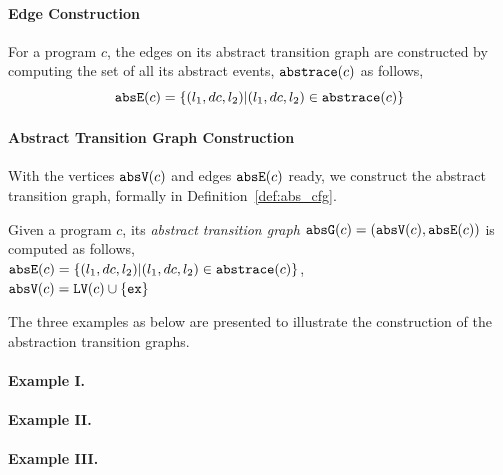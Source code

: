 \paragraph{Edge Construction}
For a program $c$, the edges on its abstract transition graph are constructed by computing the set of all its abstract events, $\mathtt{abs}{\mathtt{trace}}(c)$ as follows,
 \[
 \mathtt{abs}{\mathtt{E}}(c) = \{(l_1, dc, l_2) | (l_1, dc, l_2) \in \mathtt{abs}{\mathtt{trace}}(c)\}
 \]
\paragraph{Abstract Transition Graph Construction} 
With the vertices $\mathtt{abs}{\mathtt{V}}(c)$ and edges $\mathtt{abs}{\mathtt{E}}(c)$ ready, we construct the abstract transition graph, formally in
Definition~\ref{def:abs_cfg}.
%
\begin{defn}
\label{def:abs_cfg}
Given a program $c$, 
its \emph{abstract transition graph} $\mathtt{abs}{\mathtt{G}}(c) =(\mathtt{abs}{\mathtt{V}}(c), \mathtt{abs}{\mathtt{E}}(c))$ is computed as follows,
\\
$\mathtt{abs}{\mathtt{E}}(c) = \{(l_1, dc, l_2) | (l_1, dc, l_2) \in \mathtt{abs}{\mathtt{trace}}(c)\}$,
\\
$\mathtt{abs}{\mathtt{V}}(c) = \mathtt{LV}(c)\cup\{\mathtt{ex}\}$
\end{defn}

The three examples as below are presented to illustrate the construction of the abstraction transition graphs.
\paragraph{Example I.}
%


\paragraph{Example II.}
%


\paragraph{Example III.}
%
